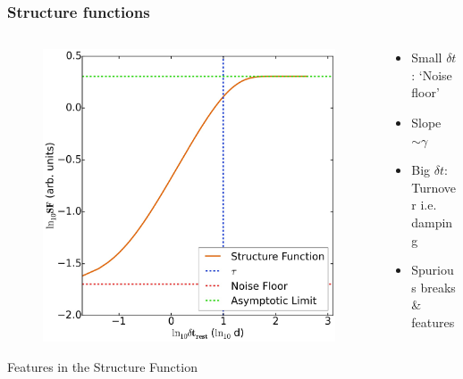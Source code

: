 \documentclass[hyperref={pdfpagelabels=false}]{beamer}
\begin{document}
\begin{frame}
\frametitle{Structure functions} 
  \begin{columns}
    \centering
    \begin{column}{0.55\textwidth}
      \begin{figure}
        \includegraphics[scale=0.12]{images/SF_Illustration.jpg}
      \end{figure}
      \centering
      {\tiny Features in the Structure Function}
    \end{column}
    \begin{column}{0.45\textwidth}
       \begin{itemize}
       \item Small $\delta t$: `Noise floor'
       \item Slope $\sim \gamma$
       \item Big $\delta t$: Turnover i.e. damping
       \item Spurious breaks \& features {\tiny \citep{Emm10}}
       \end{itemize}
    \end{column}
  \end{columns}
\end{frame}
\end{document}
